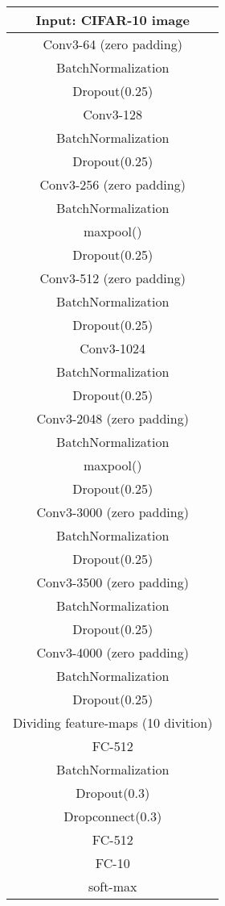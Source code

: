 \documentclass[a4j]{article}
\begin{document}
\begin{table}[t]
\begin{tabular}[t]{|c|}
    \end{tabular}
\begin{tabular}[t]{|c|} \hline
      Input:  CIFAR-10 image\\ \hline
      Conv3-64 (zero padding)\\
      BatchNormalization\\
      Dropout(0.25)\\
      Conv3-128\\
      BatchNormalization\\
      Dropout(0.25)\\
      Conv3-256 (zero padding)\\
      BatchNormalization\\ \hline
      maxpool()\\ \hline
      Dropout(0.25)\\
      Conv3-512 (zero padding)\\
      BatchNormalization\\
      Dropout(0.25)\\
      Conv3-1024\\
      BatchNormalization\\
      Dropout(0.25)\\
      Conv3-2048 (zero padding)\\
      BatchNormalization\\ \hline
      maxpool()\\ \hline
      Dropout(0.25)\\
      Conv3-3000 (zero padding)\\
      BatchNormalization\\
      Dropout(0.25)\\
      Conv3-3500 (zero padding)\\
      BatchNormalization\\
      Dropout(0.25)\\
      Conv3-4000 (zero padding)\\
      BatchNormalization\\
      Dropout(0.25)\\ \hline\hline
      Dividing feature-maps (10 divition)\\ \hline\hline
      FC-512\\
      BatchNormalization\\
      Dropout(0.3)\\ \hline
      Dropconnect(0.3)\\
      FC-512\\ \hline
      FC-10\\ \hline
      soft-max\\ \hline
    \end{tabular}
\end{table}
\end{document}
